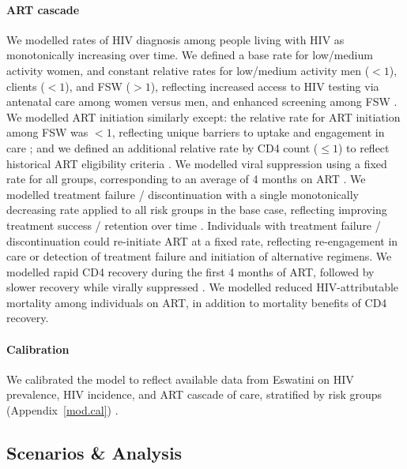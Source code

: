 \paragraph{ART cascade}
We modelled rates of HIV diagnosis among people living with HIV as monotonically increasing over time.
We defined a base rate for low/medium activity women,
and constant relative rates for low/medium activity men ($<1$), clients ($<1$), and FSW ($>1$),
reflecting increased access to HIV testing via antenatal care among women versus men,
and enhanced screening among FSW \cite{Baral2014}.
We modelled ART initiation similarly except:
the relative rate for ART initiation among FSW was $<1$,
reflecting unique barriers to uptake and engagement in care \cite{Mountain2014sr}; and
we defined an additional relative rate by CD4 count ($\le1$)
to reflect historical ART eligibility criteria \cite{NERCHA2018}.
We modelled viral suppression using a fixed rate for all groups,
corresponding to an average of 4 months on ART \cite{Mujugira2016}.
We modelled treatment failure / discontinuation with a single monotonically decreasing rate
applied to all risk groups in the base case,
reflecting improving treatment success / retention over time \cite{NERCHA2014}.
Individuals with treatment failure / discontinuation could re-initiate ART at a fixed rate,
reflecting re-engagement in care or detection of treatment failure and initiation of alternative regimens.
We modelled rapid CD4 recovery during the first 4 months of ART,
followed by slower recovery while virally suppressed \cite{Battegay2006,Lawn2006,Gabillard2013}.
We modelled reduced HIV-attributable mortality among individuals on ART,
in addition to mortality benefits of CD4 recovery.
\paragraph{Calibration}
We calibrated the model to reflect
available data from Eswatini on HIV prevalence, HIV incidence, and ART cascade of care,
stratified by risk groups (Appendix~\ref{mod.cal}) \cite{SDHS2006,SHIMS1,SHIMS2,Baral2014,EswKP2014}.
\subsection*{Scenarios \& Analysis}\label{meth.obj}
